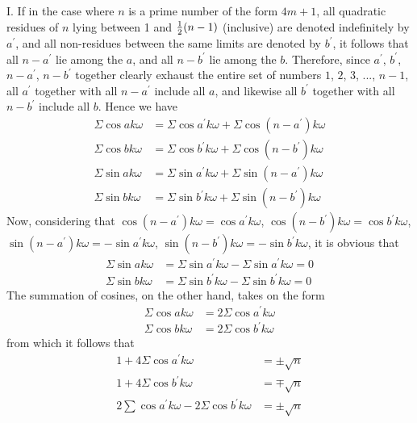\documentclass[twoside,12pt]{memoir}
\let\oldfrac\frac
\def\frac#1#2{\mathchoice{\tfrac{#1}{#2}}{\oldfrac{#1}{#2}}{\genfrac{}{}{}{2}{#1}{#2\mathstrut}}{\genfrac{}{}{}{3}{#1}{#2\mathstrut}}}
\begin{document}
I. If in the case where \(n\) is a prime number of the form \(4m+1\), all quadratic residues of \(n\) lying between 1 and \(\frac{1}{2}(n-1)\) (inclusive) are denoted indefinitely by \(a^{\prime}\), and all non-residues between the same limits are denoted by \(b^{\prime}\), it follows that all \(n-a^{\prime}\) lie among the \(a\), and all \(n-b^{\prime}\) lie among the \(b\). Therefore, since \(a^{\prime}\), \(b^{\prime}\), \(n-a^{\prime}\), \(n-b^{\prime}\) together clearly exhaust the entire set of numbers \(1\), \(2\), \(3\), ..., \(n-1\), all \(a^{\prime}\) together with all \(n-a^{\prime}\) include all \(a\), and likewise all \(b^{\prime}\) together with all \(n-b^{\prime}\) include all \(b\). Hence we have
\[\begin{aligned}
\Sigma \cos ak\omega &= \Sigma \cos a^{\prime}k\omega + \Sigma \cos (n-a^{\prime})k\omega \\
\Sigma \cos bk\omega &= \Sigma \cos b^{\prime}k\omega + \Sigma \cos (n-b^{\prime})k\omega \\
\Sigma \sin ak\omega &= \Sigma \sin a^{\prime}k\omega + \Sigma \sin (n-a^{\prime})k\omega \\
\Sigma \sin bk\omega &= \Sigma \sin b^{\prime}k\omega + \Sigma \sin (n-b^{\prime})k\omega
\end{aligned}\]
Now, considering that \(\cos (n-a^{\prime})k\omega = \cos a^{\prime}k\omega\), \(\cos (n-b^{\prime})k\omega = \cos b^{\prime}k\omega\), \(\sin (n-a^{\prime})k\omega = -\sin a^{\prime}k\omega\), \(\sin (n-b^{\prime})k\omega = -\sin b^{\prime}k\omega\), it is obvious that
\[\begin{aligned}
\Sigma \sin ak\omega &= \Sigma \sin a^{\prime}k\omega - \Sigma \sin a^{\prime}k\omega = 0 \\
\Sigma \sin bk\omega &= \Sigma \sin b^{\prime}k\omega - \Sigma \sin b^{\prime}k\omega = 0
\end{aligned}\]
The summation of cosines, on the other hand, takes on the form
\[\begin{aligned}
\Sigma \cos ak\omega &= 2 \Sigma \cos a^{\prime}k\omega \\
\Sigma \cos bk\omega &= 2 \Sigma \cos b^{\prime}k\omega
\end{aligned}\]
from which it follows that
\[\begin{aligned}
1 + 4\Sigma \cos a^{\prime}k\omega &= \pm \sqrt{n} \\
1 + 4\Sigma \cos b^{\prime}k\omega &= \mp \sqrt{n} \\
2 \sum \cos a^{\prime}k\omega - 2 \Sigma \cos b^{\prime}k\omega &= \pm \sqrt{n}
\end{aligned}\]
%
\end{document}
